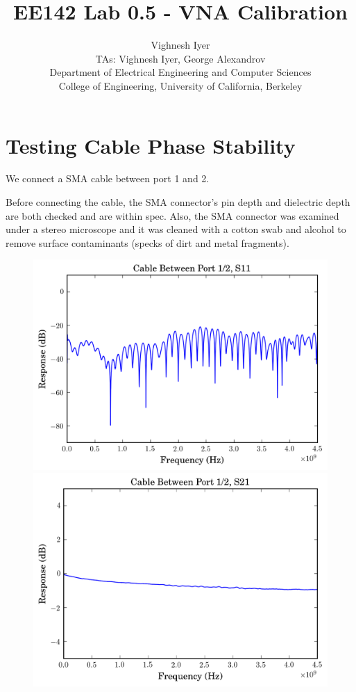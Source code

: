\documentclass[11pt]{article}
\begin{document}
\title{EE142 Lab 0.5 - VNA Calibration}

\author{Vighnesh Iyer \\
TAs: Vighnesh Iyer, George Alexandrov \\Department of Electrical Engineering and Computer Sciences\\
College of Engineering, University of California, Berkeley}
\date{}
\maketitle

\section{Testing Cable Phase Stability}
We connect a SMA cable between port 1 and 2. 

Before connecting the cable, the SMA connector's pin depth and dielectric depth are both checked and are within spec. Also, the SMA connector was examined under a stereo microscope and it was cleaned with a cotton swab and alcohol to remove surface contaminants (specks of dirt and metal fragments).

\begin{figure}[H]
	\includegraphics[width=\linewidth]{images/cable_phase_s11.png}
	\endminipage\hfill
	\includegraphics[width=\linewidth]{images/cable_phase_s21.png}
	\endminipage
\end{figure}
\end{document}
